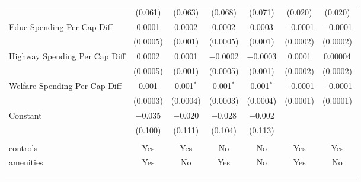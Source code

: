 \begin{table}[!htbp]
\begin{tabular}{@{\extracolsep{5pt}}lcccccc}
  & (0.061) & (0.063) & (0.068) & (0.071) & (0.020) & (0.020) \\ 
  Educ Spending Per Cap Diff & 0.0001 & 0.0002 & 0.0002 & 0.0003 & $-$0.0001 & $-$0.0001 \\ 
  & (0.0005) & (0.001) & (0.0005) & (0.001) & (0.0002) & (0.0002) \\ 
  Highway Spending Per Cap Diff & 0.0002 & 0.0001 & $-$0.0002 & $-$0.0003 & 0.0001 & 0.00004 \\ 
  & (0.0005) & (0.001) & (0.0005) & (0.001) & (0.0002) & (0.0002) \\ 
  Welfare Spending Per Cap Diff & 0.001 & 0.001$^{*}$ & 0.001$^{*}$ & 0.001$^{*}$ & $-$0.0001 & $-$0.0001 \\ 
  & (0.0003) & (0.0004) & (0.0003) & (0.0004) & (0.0001) & (0.0001) \\ 
  Constant & $-$0.035 & $-$0.020 & $-$0.028 & $-$0.002 &  &  \\ 
  & (0.100) & (0.111) & (0.104) & (0.113) &  &  \\ 
 \hline \\[-1.8ex] 
controls & Yes & Yes & No & No & Yes & Yes \\ 
amenities & Yes & No & Yes & No & Yes & No \\ 
\hline \\[-1.8ex] 
\hline 
\hline \\[-1.8ex] 
\end{tabular} 
\end{table} 

